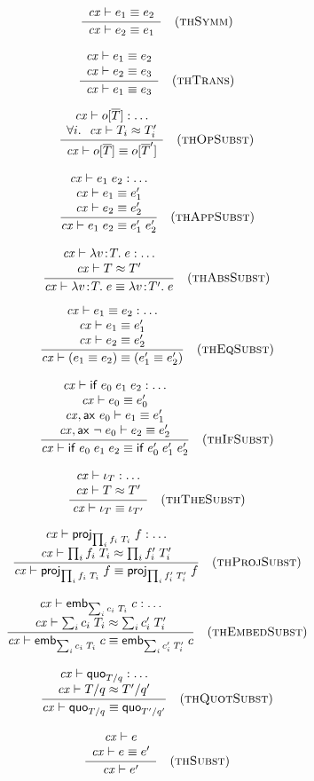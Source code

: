 \[
\frac{\begin{array}{c}\mathit{cx}\vdash e_1\equiv e_2\end{array}}{\mathit{cx}\vdash e_2\equiv e_1}\quad\mbox{(\textsc{thSymm})}
\]

\[
\frac{\begin{array}{c}\mathit{cx}\vdash e_1\equiv e_2\\\mathit{cx}\vdash e_2\equiv e_3\end{array}}{\mathit{cx}\vdash e_1\equiv e_3}\quad\mbox{(\textsc{thTrans})}
\]

\[
\frac{\begin{array}{c}\mathit{cx}\vdash o[\overline{T}]:\ldots\\\forall i.\ \ \mathit{cx}\vdash T_i\approx T_i'\end{array}}{\mathit{cx}\vdash o[\overline{T}]\equiv o[\overline{T}']}\quad\mbox{(\textsc{thOpSubst})}
\]

\[
\frac{\begin{array}{c}\mathit{cx}\vdash e_1\;e_2:\ldots\\\mathit{cx}\vdash e_1\equiv e_1'\\\mathit{cx}\vdash e_2\equiv e_2'\end{array}}{\mathit{cx}\vdash e_1\;e_2\equiv e_1'\;e_2'}\quad\mbox{(\textsc{thAppSubst})}
\]

\[
\frac{\begin{array}{c}\mathit{cx}\vdash\lambda v\!:\!T.\;e:\ldots\\\mathit{cx}\vdash T\approx T'\end{array}}{\mathit{cx}\vdash\lambda v\!:\!T.\;e\equiv\lambda v\!:\!T'.\;e}\quad\mbox{(\textsc{thAbsSubst})}
\]

\[
\frac{\begin{array}{c}\mathit{cx}\vdash e_1\equiv e_2:\ldots\\\mathit{cx}\vdash e_1\equiv e_1'\\\mathit{cx}\vdash e_2\equiv e_2'\end{array}}{\mathit{cx}\vdash(e_1\equiv e_2)\equiv(e_1'\equiv e_2')}\quad\mbox{(\textsc{thEqSubst})}
\]

\[
\frac{\begin{array}{c}\mathit{cx}\vdash\mathsf{if}\;e_0\;e_1\;e_2:\ldots\\\mathit{cx}\vdash e_0\equiv e_0'\\\mathit{cx},\mathsf{ax}\ e_0\vdash e_1\equiv e_1'\\\mathit{cx},\mathsf{ax}\ \neg\;e_0\vdash e_2\equiv e_2'\end{array}}{\mathit{cx}\vdash\mathsf{if}\;e_0\;e_1\;e_2\equiv\mathsf{if}\;e_0'\;e_1'\;e_2'}\quad\mbox{(\textsc{thIfSubst})}
\]

\[
\frac{\begin{array}{c}\mathit{cx}\vdash\iota_{T}:\ldots\\\mathit{cx}\vdash T\approx T'\end{array}}{\mathit{cx}\vdash\iota_{T}\equiv\iota_{T'}}\quad\mbox{(\textsc{thTheSubst})}
\]

\[
\frac{\begin{array}{c}\mathit{cx}\vdash\mathsf{proj}_{\prod_{i}f_i\;T_i}\;{f}:\ldots\\\mathit{cx}\vdash\prod_{i}f_i\;T_i\approx\prod_{i}f_i'\;T_i'\end{array}}{\mathit{cx}\vdash\mathsf{proj}_{\prod_{i}f_i\;T_i}\;{f}\equiv\mathsf{proj}_{\prod_{i}f_i'\;T_i'}\;{f}}\quad\mbox{(\textsc{thProjSubst})}
\]

\[
\frac{\begin{array}{c}\mathit{cx}\vdash\mathsf{emb}_{\sum_{i}c_i\;T_i}\;{c}:\ldots\\\mathit{cx}\vdash\sum_{i}c_i\;T_i\approx\sum_{i}c_i'\;T_i'\end{array}}{\mathit{cx}\vdash\mathsf{emb}_{\sum_{i}c_i\;T_i}\;{c}\equiv\mathsf{emb}_{\sum_{i}c_i'\;T_i'}\;{c}}\quad\mbox{(\textsc{thEmbedSubst})}
\]

\[
\frac{\begin{array}{c}\mathit{cx}\vdash\mathsf{quo}_{T/q}:\ldots\\\mathit{cx}\vdash T/q\approx T'/q'\end{array}}{\mathit{cx}\vdash\mathsf{quo}_{T/q}\equiv\mathsf{quo}_{T'/q'}}\quad\mbox{(\textsc{thQuotSubst})}
\]


\[
\frac{\begin{array}{c}\mathit{cx}\vdash e\\\mathit{cx}\vdash e\equiv e'\end{array}}{\mathit{cx}\vdash e'}\quad\mbox{(\textsc{thSubst})}
\]


